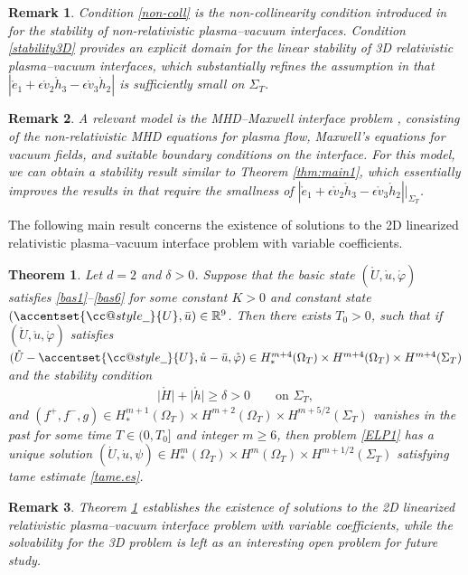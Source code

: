 \documentclass[twoside,11pt]{article}
\makeatletter
\numberwithin{equation}{section}
\newtheorem{theorem}{Theorem}[section]
\newtheorem{remark}{Remark}[section]
\def\widebar{\accentset{{\cc@style\underline{\mskip10mu}}}}
\makeatother
\begin{document}
 

\begin{remark}
Condition \eqref{non-coll} is the non-collinearity condition introduced in {\rm\cite{T10MR2718711}} for the stability of non-relativistic plasma--vacuum interfaces.
		Condition \eqref{stability3D} provides an explicit domain for the linear stability of 3D relativistic plasma--vacuum interfaces, which substantially refines the assumption in {\rm\cite[Theorem 4.2]{T12MR2974767}} that $ |\mathring{e}_1+\epsilon \mathring{v}_2\mathring{h}_3-\epsilon \mathring{v}_3\mathring{h}_2 |$ is sufficiently small on ${\Sigma_T}$.
\end{remark}

\begin{remark}
	A relevant model is the MHD--Maxwell interface problem {\rm\cite{MT14MR3194371,CDS14MR3248397}}, consisting of the non-relativistic MHD equations for plasma flow, Maxwell's equations for vacuum fields, and suitable boundary conditions on the interface.
	For this model, we can obtain a stability result similar to Theorem \ref{thm:main1}, which essentially improves the results in {\rm\cite{MT14MR3194371,CDS14MR3248397}} that require the smallness of $ |\mathring{e}_1+\epsilon \mathring{v}_2\mathring{h}_3-\epsilon \mathring{v}_3\mathring{h}_2 ||_{\Sigma_T}$.
\end{remark}

The following main result concerns the existence of solutions to the 2D linearized relativistic plasma--vacuum interface problem with variable coefficients.
		\begin{theorem}
		\label{thm:main2}
Let $d=2$ and $\delta>0$. Suppose that the basic state  $(\mathring{U},\mathring{u},\mathring{\varphi}) $ satisfies \eqref{bas1}--\eqref{bas6} for some constant $K>0$ and constant state $(\widebar{U},\bar{u})\in\mathbb{R}^9$.
Then there exists $T_0>0$, such that if
 $(\mathring{U},\mathring{u},\mathring{\varphi}) $ satisfies
$(\mathring{U}-\widebar{U},\mathring{u}-\bar{u},\mathring{\varphi}) \in H_*^{{m+4}}(\Omega_{T})\times H^{{m+4}}(\Omega_{T}) \times  H^{{m+4}}(\Sigma_T)$
and the stability condition
\begin{align}
	\label{bas10}
{	\big| \mathring{H}\big|+\big|\mathring{h} \big|\geq {\delta} >0	\qquad \textrm{on }\Sigma_T, }
\end{align}
and $(f^+,f^-,g )\in H_*^{m+1}(\Omega_{T})\times H^{m+2}(\Omega_{T})\times H^{m+{5/2}}(\Sigma_{T})$ vanishes in the past
for some time $T\in (0, T_0]$ and integer $m\geq 6$,
then problem \eqref{ELP1} has a unique solution $(\dot{U},\dot{u},\psi)\in H_*^{m}(\Omega_{T})\times H^{m}(\Omega_{T})\times H^{m+1/2}(\Sigma_T)$ satisfying tame estimate \eqref{tame.es}.
	\end{theorem}
\begin{remark}
	Theorem \ref{thm:main2} establishes the existence of solutions to the 2D linearized relativistic plasma--vacuum interface problem with variable coefficients, while the solvability for the 3D problem is left as an interesting open problem for future study.
\end{remark}	
	
\end{document}
